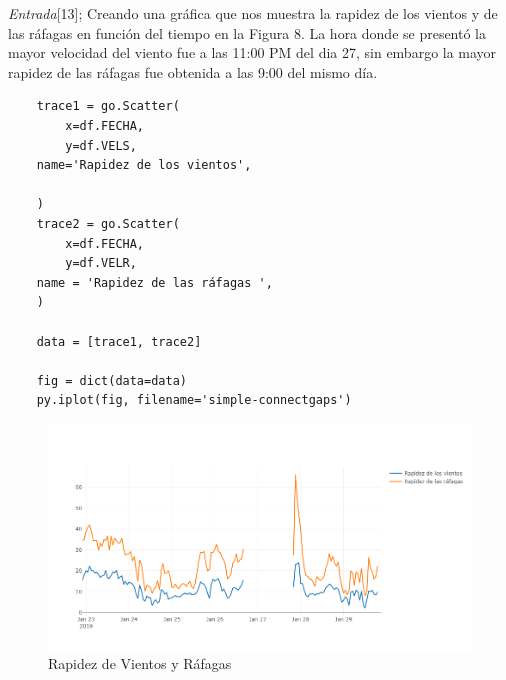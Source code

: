 \documentclass[11pt, spanish]{report}
\begin{document}
\emph{Entrada}[13]; Creando una gráfica que nos muestra la rapidez de los vientos y de las ráfagas en función del tiempo en la Figura 8. La hora donde se presentó la mayor velocidad del viento fue a las 11:00 PM del dia 27, sin embargo la mayor rapidez de las ráfagas fue obtenida a las 9:00 del mismo día.
\begin{verbatim}
    trace1 = go.Scatter(
        x=df.FECHA,
        y=df.VELS,
    name='Rapidez de los vientos',
   
    )
    trace2 = go.Scatter(
        x=df.FECHA,
        y=df.VELR,
    name = 'Rapidez de las ráfagas ',
    )

    data = [trace1, trace2]

    fig = dict(data=data)
    py.iplot(fig, filename='simple-connectgaps')
\end{verbatim}
\begin{figure}[h]
\caption{Rapidez de Vientos y Ráfagas}
\centering
\includegraphics[width=\textwidth]{vientosrafagas.png}
\end{figure}
\end{document}
